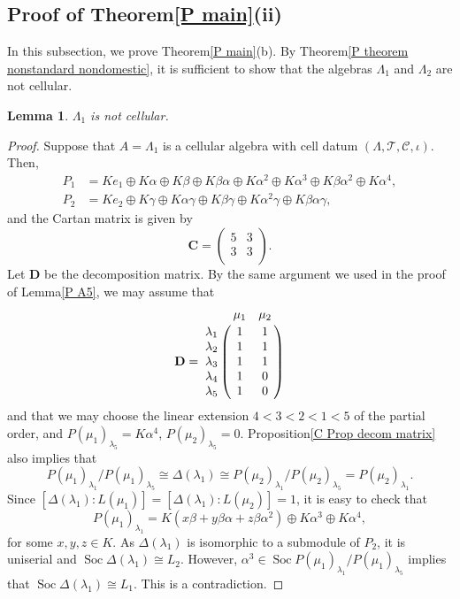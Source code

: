 \documentclass[12pt]{amsart}
\newtheorem{lem}[thm]{Lemma}
\numberwithin{equation}{thm}
\newcommand\bC{\mathbf C}
\newcommand\bD{\mathbf D}
\newcommand\cC{\mathcal{C}}
\newcommand\cT{\mathcal{T}}
\newcommand\la{\lambda}
\newcommand\D{\Delta}
\newcommand\Soc{\operatorname{Soc}}
\newcounter{ni}
\begin{document}
{\subsection{Proof of Theorem\;\ref{P main}\;(ii)}
In this subsection, we prove Theorem\;\ref{P main}\;(b).
By Theorem\;\ref{P theorem nonstandard nondomestic}, 
it is sufficient to show that the algebras $\Lambda_1$ and $\Lambda_2$ are not cellular. 
\begin{lem}
\label{P lambda1}
$\Lambda_1$ is not cellular.
\end{lem}
\begin{proof}
Suppose that $A=\Lambda_1$ is a cellular algebra with cell datum $(\Lambda,\cT,\cC,\iota)$.
Then,
\begin{align*}
P_1 &=
Ke_1\oplus K\alpha\oplus K\beta\oplus K\beta\alpha\oplus K\alpha^2\oplus K\alpha^3
\oplus K\beta\alpha^2\oplus K\alpha^4, \\
P_2 &=
Ke_2\oplus K\gamma\oplus K\alpha\gamma\oplus K\beta\gamma\oplus K\alpha^2\gamma
\oplus K\beta\alpha\gamma,
\end{align*}
and the Cartan matrix is given by
\[ \bC=\begin{pmatrix}
5& 3 \\
3 & 3\\
\end{pmatrix}.
\]
Let $\bD$ be the decomposition matrix. 
By the same argument we used in the proof of Lemma\;\ref{P A5}, we may assume that 
 \[\bD=\bordermatrix{
& \mu_1 & \mu_2 \cr
\lambda_1 & 1 & 1 \cr
\lambda_2 & 1 & 1 \cr
\lambda_3 & 1 & 1 \cr
\lambda_4 & 1 & 0 \cr
\lambda_5 & 1 & 0 \cr
} 
\] 
and that we may choose the linear extension $4<3<2<1<5$ of the partial order, and 
$P(\mu_1)_{\lambda_5}=K \alpha^4$, $P(\mu_2)_{\lambda_5}=0$.
 Proposition\;\ref{C Prop decom matrix} also implies that 
\[P(\mu_1)_{\lambda_1}/P(\mu_1)_{\lambda_5}\cong \D(\lambda_1)
\cong P(\mu_2)_{\lambda_1}/P(\mu_2)_{\lambda_5}=P(\mu_2)_{\lambda_1}.\]
Since $[\D(\lambda_1):L(\mu_1)]=[\D(\lambda_1):L(\mu_2)]=1$, it is easy to check that
\[P(\mu_1)_{\lambda_1}
=K(x\beta+y\beta\alpha+z\beta\alpha^2)\oplus K\alpha^3\oplus K\alpha^4,\]
for some $x,y, z\in K$. As $\Delta(\lambda_1)$ is isomorphic to a submodule of $P_2$, 
it is uniserial and $\Soc \Delta(\la_1)\cong L_2$. However, 
$\alpha^3\in \Soc P(\mu_1)_{\lambda_1}/P(\mu_1)_{\lambda_5}$ implies that 
$\Soc \Delta(\la_1)\cong L_1$. This is a contradiction.

\end{proof}}
\end{document}
